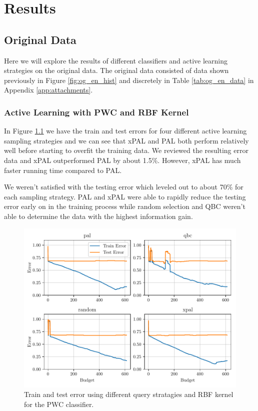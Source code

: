 \chapter{Results}

\section{Original Data}

Here we will explore the results of different classifiers and active learning strategies on the original data. The original data consisted of data shown previously in Figure \ref{fig:og_en_hist} and discretely in Table \ref{tab:og_en_data} in Appendix \ref{app:attachments}. 

\subsection{Active Learning with PWC and RBF Kernel}

In Figure \ref{fig:plot_all_results_rbf} we have the train and test errors for four different active learning sampling strategies and we can see that xPAL and PAL both perform relatively well before starting to overfit the training data. We reviewed the resulting error data and xPAL outperformed PAL by about 1.5\%. However, xPAL has much faster running time compared to PAL. 

We weren't satisfied with the testing error which leveled out to about 70\% for each sampling strategy. PAL and xPAL were able to rapidly reduce the testing error early on in the training process while random selection and QBC weren't able to determine the data with the highest information gain. 

\begin{figure}[ht]
  \centering
  \includegraphics[width=\textwidth]{../img/plot_all_results_rbf.pdf}
  \caption{Train and test error using different query stratagies and RBF kernel for the PWC classifier.}
  \label{fig:plot_all_results_rbf}
\end{figure}

